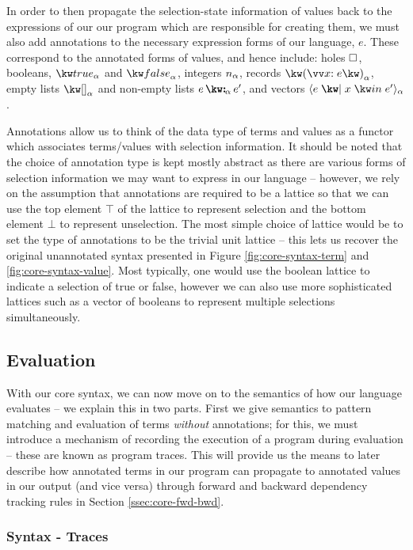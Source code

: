 In order to then propagate the selection-state information of values back to the expressions of our our program which are responsible for creating them, we must also add annotations to the necessary expression forms of our language, $e$. These correspond to the annotated forms of values, and hence include: holes $\square$, booleans, $\annTrue{\alpha}$ and $\annFalse{\alpha}$, integers $n_{\alpha}$, records $\annRec{\vec{\bind{x}{e}}}{\alpha}$, empty lists $\annNil{\alpha}$ and non-empty lists $\annCons{e}{e'}{\alpha}$, and vectors $\annVec{e}{x}{e'}{\alpha}$.

Annotations allow us to think of the data type of terms and values as a functor which associates terms/values with selection information. It should be noted that the choice of annotation type is kept mostly abstract as there are various forms of selection information we may want to express in our language -- however, we rely on the assumption that annotations are required to be a lattice so that we can use the top element $\top$ of the lattice to represent selection and the bottom element $\bot$ to represent unselection. The most simple choice of lattice would be to set the type of annotations to be the trivial unit lattice -- this lets us recover the original unannotated syntax presented in Figure \ref{fig:core-syntax-term} and \ref{fig:core-syntax-value}. Most typically, one would use the boolean lattice to indicate a selection of true or false, however we can also use more sophisticated lattices such as a vector of booleans to represent multiple selections simultaneously.


\subsection{Evaluation}

With our core syntax, we can now move on to the semantics of how our language evaluates -- we explain this in two parts. First we give semantics to pattern matching and evaluation of terms \textit{without} annotations; for this, we must introduce a mechanism of recording the execution of a program during evaluation -- these are known as program traces. This will provide us the means to later describe how annotated terms in our program can propagate to annotated values in our output (and vice versa) through forward and backward dependency tracking rules in Section \ref{ssec:core-fwd-bwd}.

\subsubsection{Syntax - Traces}
\label{ssec:core-syntax-trace}


